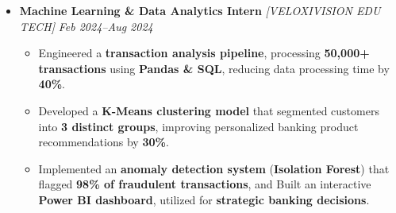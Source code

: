 \documentclass[a4paper,10pt]{article}
\begin{document}
\begin{itemize}

\vspace{-1mm}
\item {\bf Machine Learning \& Data Analytics Intern } \textit{[VELOXIVISION EDU TECH]}
\textit{\hfill 
{Feb 2024–Aug 2024}
}
\vspace{-1mm}

\begin{itemize}

\item Engineered a \textbf{transaction analysis pipeline}, processing \textbf{50,000+ transactions} using \textbf{Pandas \& SQL}, reducing data processing time by \textbf{40\%}.

\item Developed a \textbf{K-Means clustering model} that segmented customers into \textbf{3 distinct groups}, improving personalized banking product recommendations by \textbf{30\%}.

\item Implemented an \textbf{anomaly detection system} (\textbf{Isolation Forest}) that flagged \textbf{98\% of fraudulent transactions}, and Built an interactive \textbf{Power BI dashboard}, utilized for \textbf{strategic banking decisions}.

\vspace{-1mm}

\end{itemize}
\end{itemize}
\end{document}

